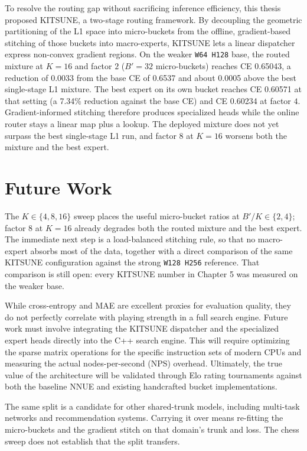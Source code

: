 To resolve the routing gap without sacrificing inference efficiency, this thesis proposed KITSUNE, a two-stage routing framework. By decoupling the geometric partitioning of the L1 space into micro-buckets from the offline, gradient-based stitching of those buckets into macro-experts, KITSUNE lets a linear dispatcher express non-convex gradient regions. On the weaker \texttt{W64 H128} base, the routed mixture at $K=16$ and factor $2$ ($B'=32$ micro-buckets) reaches CE 0.65043, a reduction of 0.0033 from the base CE of 0.6537 and about 0.0005 above the best single-stage L1 mixture. The best expert on its own bucket reaches CE 0.60571 at that setting (a 7.34\% reduction against the base CE) and CE 0.60234 at factor $4$. Gradient-informed stitching therefore produces specialized heads while the online router stays a linear map plus a lookup. The deployed mixture does not yet surpass the best single-stage L1 run, and factor $8$ at $K=16$ worsens both the mixture and the best expert.

\section{Future Work}

The $K \in \{4, 8, 16\}$ sweep places the useful micro-bucket ratios at $B'/K \in \{2, 4\}$; factor $8$ at $K=16$ already degrades both the routed mixture and the best expert. The immediate next step is a load-balanced stitching rule, so that no macro-expert absorbs most of the data, together with a direct comparison of the same KITSUNE configuration against the strong \texttt{W128 H256} reference. That comparison is still open: every KITSUNE number in Chapter 5 was measured on the weaker base.

While cross-entropy and MAE are excellent proxies for evaluation quality, they do not perfectly correlate with playing strength in a full search engine. Future work must involve integrating the KITSUNE dispatcher and the specialized expert heads directly into the C++ search engine. This will require optimizing the sparse matrix operations for the specific instruction sets of modern CPUs and measuring the actual nodes-per-second (NPS) overhead. Ultimately, the true value of the architecture will be validated through Elo rating tournaments against both the baseline NNUE and existing handcrafted bucket implementations.

The same split is a candidate for other shared-trunk models, including multi-task networks and recommendation systems. Carrying it over means re-fitting the micro-buckets and the gradient stitch on that domain's trunk and loss. The chess sweep does not establish that the split transfers.

